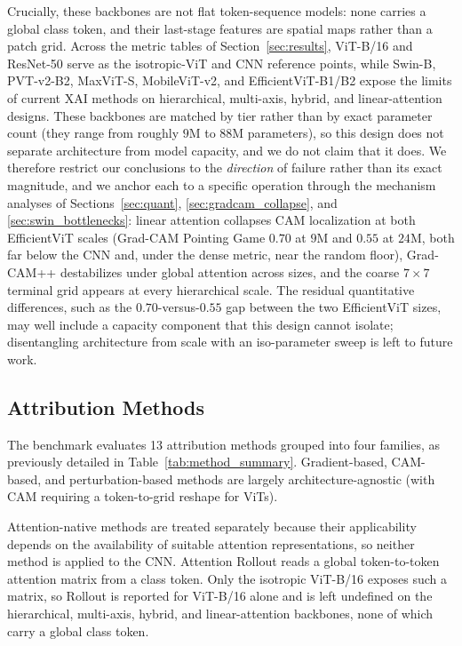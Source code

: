 \documentclass[final,5p,times,twocolumn]{elsarticle}
\begin{document}
Crucially, these backbones are not flat token-sequence models: none carries a global class token, and their last-stage features are spatial maps rather than a patch grid. Across the metric tables of Section~\ref{sec:results}, ViT-B/16 and ResNet-50 serve as the isotropic-ViT and CNN reference points, while Swin-B, PVT-v2-B2, MaxViT-S, MobileViT-v2, and EfficientViT-B1/B2 expose the limits of current XAI methods on hierarchical, multi-axis, hybrid, and linear-attention designs. These backbones are matched by tier rather than by exact parameter count (they range from roughly $9$M to $88$M parameters), so this design does not separate architecture from model capacity, and we do not claim that it does. We therefore restrict our conclusions to the \emph{direction} of failure rather than its exact magnitude, and we anchor each to a specific operation through the mechanism analyses of Sections~\ref{sec:quant}, \ref{sec:gradcam_collapse}, and \ref{sec:swin_bottlenecks}: linear attention collapses CAM localization at both EfficientViT scales (Grad-CAM Pointing Game $0.70$ at $9$M and $0.55$ at $24$M, both far below the CNN and, under the dense metric, near the random floor), Grad-CAM++ destabilizes under global attention across sizes, and the coarse $7\times7$ terminal grid appears at every hierarchical scale. The residual quantitative differences, such as the $0.70$-versus-$0.55$ gap between the two EfficientViT sizes, may well include a capacity component that this design cannot isolate; disentangling architecture from scale with an iso-parameter sweep is left to future work.

\subsection{Attribution Methods}
The benchmark evaluates 13 attribution methods grouped into four families, as previously detailed in Table~\ref{tab:method_summary}. Gradient-based, CAM-based, and perturbation-based methods are largely architecture-agnostic (with CAM requiring a token-to-grid reshape for ViTs).

Attention-native methods are treated separately because their applicability depends on the availability of suitable attention representations, so neither method is applied to the CNN. Attention Rollout reads a global token-to-token attention matrix from a class token. Only the isotropic ViT-B/16 exposes such a matrix, so Rollout is reported for ViT-B/16 alone and is left undefined on the hierarchical, multi-axis, hybrid, and linear-attention backbones, none of which carry a global class token.
\end{document}
